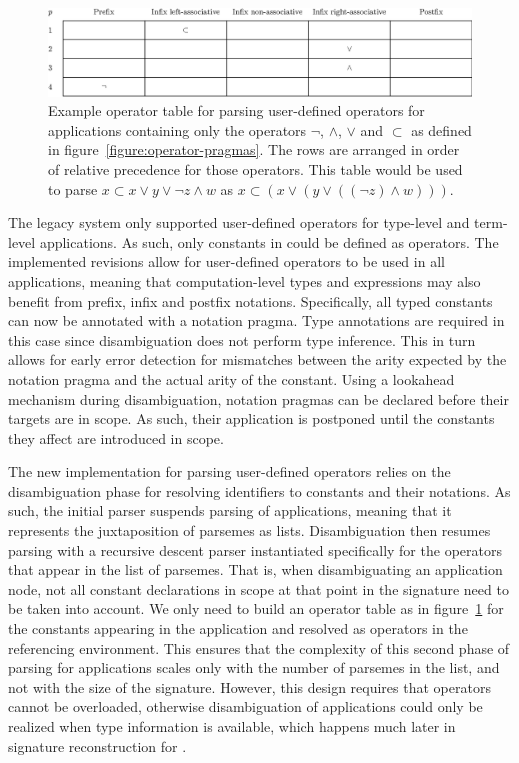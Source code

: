 \begin{figure}[htb]
\includegraphics[width=\textwidth]{figures/operator-table.eps}
\caption[Example operator table for parsing user-defined operators]{%
Example operator table for parsing user-defined operators for applications containing only the operators $\lnot$, $\land$, $\lor$ and $\subset$ as defined in figure~\ref{figure:operator-pragmas}.
The rows are arranged in order of relative precedence for those operators.
This table would be used to parse $x \subset x \lor y \lor \lnot z \land w$ as $x \subset (x \lor (y \lor ((\lnot z) \land w)))$.
}
\label{figure:operator-table}
\end{figure}

The legacy \Beluga system only supported user-defined operators for \LF type-level and term-level applications.
As such, only constants in \LF could be defined as operators.
The implemented revisions allow for user-defined operators to be used in all applications, meaning that computation-level types and expressions may also benefit from prefix, infix and postfix notations.
Specifically, all typed constants can now be annotated with a notation pragma.
Type annotations are required in this case since disambiguation does not perform type inference.
This in turn allows for early error detection for mismatches between the arity expected by the notation pragma and the actual arity of the constant.
Using a lookahead mechanism during disambiguation, notation pragmas can be declared before their targets are in scope.
As such, their application is postponed until the constants they affect are introduced in scope.

The new implementation for parsing user-defined operators relies on the disambiguation phase for resolving identifiers to constants and their notations.
As such, the initial parser suspends parsing of applications, meaning that it represents the juxtaposition of parsemes as lists.
Disambiguation then resumes parsing with a recursive descent parser instantiated specifically for the operators that appear in the list of parsemes.
That is, when disambiguating an application node, not all constant declarations in scope at that point in the \Beluga signature need to be taken into account.
We only need to build an operator table as in figure~\ref{figure:operator-table} for the constants appearing in the application and resolved as operators in the referencing environment.
This ensures that the complexity of this second phase of parsing for applications scales only with the number of parsemes in the list, and not with the size of the signature.
However, this design requires that operators cannot be overloaded, otherwise disambiguation of applications could only be realized when type information is available, which happens much later in signature reconstruction for \Beluga.

